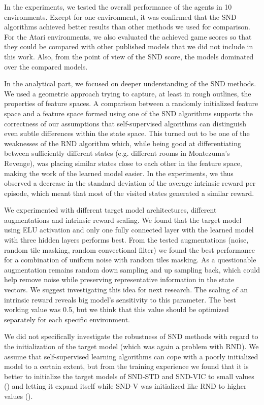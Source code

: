 \documentclass[a4paper,11pt]{elsarticle}
\begin{document}
In the experiments, we tested the overall performance of the agents in 10 environments. Except for one environment, it was confirmed that the SND algorithms achieved better results than other methods we used for comparison. For the Atari environments, we also evaluated the achieved game scores so that they could be compared with other published models that we did not include in this work. Also, from the point of view of the SND score, the models dominated over the compared models.

In the analytical part, we focused on deeper understanding of the SND methods. We used a geometric approach trying to capture, at least in rough outlines, the properties of feature spaces. A comparison between a randomly initialized feature space and a feature space formed using one of the SND algorithms supports the correctness of our assumptions that self-supervised algorithms can distinguish even subtle differences within the state space. This turned out to be one of the weaknesses of the RND algorithm which, while being good at differentiating between sufficiently different states (e.g. different rooms in Montezuma's Revenge), was placing similar states close to each other in the feature space, making the work of the learned model easier. In the experiments, we thus observed a decrease in the standard deviation of the average intrinsic reward per episode, which meant that most of the visited states generated a similar reward.

We experimented with different target model architectures, different augmentations and intrinsic reward scaling. We found that the target model using ELU activation and only one fully connected layer with the learned model with three hidden layers performs best. 
From the tested augmentations (noise, random tile masking, random convectional filter) we found the best performance for a combination of uniform noise with random tiles masking. As a questionable augmentation remains random down sampling and up sampling back, which could help remove noise while preserving representative information in the state vectors. We suggest investigating this idea for next research.
The scaling of an intrinsic reward reveals big model's sensitivity to this parameter. The best working value was 0.5, but we think that this value should be optimized separately for each specific environment.  

We did not specifically investigate the robustness of SND methods with regard to the initialization of the target model (which was again a problem with RND). We assume that self-supervised learning algorithms can cope with a poorly initialized model to a certain extent, but from the training experience we found that it is better to initialize the target models of SND-STD and SND-VIC to small values () and letting it expand itself while SND-V was initialized like RND to higher values ().
\end{document}
